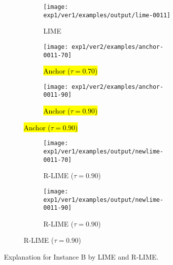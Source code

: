 \begin{figure}[t]
	\begin{subfigure}[t]{0.45\textwidth}
		\begin{subfigure}[t]{\textwidth}
			\hspace{-26.5pt}
			\texttt{[image: exp1/ver1/examples/output/lime-0011]}
			\caption{LIME}\label{fig:lime-1}
			\vspace{1.0em}
		\end{subfigure}

		\vspace{10pt}
		\begin{subfigure}[t]{\textwidth}
			\centering
			\texttt{[image: exp1/ver2/examples/anchor-0011-70]}  %
			\caption{\hl{Anchor ($\tau=0.70$)}}\label{fig:anchor-1-70}
			\vspace{1.0em}
		\end{subfigure}

		\vspace{10pt}
		\begin{subfigure}[t]{\textwidth}
			\centering
			\texttt{[image: exp1/ver2/examples/anchor-0011-90]}  %
			\caption{\hl{Anchor ($\tau=0.90$)}}\label{fig:anchor-1-90}
			\vspace{1.0em}
		\end{subfigure}
	\end{subfigure}
	\hfill
	\begin{subfigure}[t]{0.45\textwidth}
		\begin{subfigure}[t]{\textwidth}
			\hspace{-5pt}
			\texttt{[image: exp1/ver1/examples/output/newlime-0011-70]}  %
			\caption{R-LIME ($\tau=0.90$)}
		\end{subfigure}
		\begin{subfigure}[t]{\textwidth}
			\hspace{-20pt}
			\texttt{[image: exp1/ver1/examples/output/newlime-0011-90]}  %
			\caption{R-LIME ($\tau=0.90$)}\label{fig:rlime-1-90}
		\end{subfigure}
	\end{subfigure}
	\caption[Explanation for Instance B by LIME and R-LIME]{%
		Explanation for Instance B by LIME and R-LIME\@.
	}\label{fig:B}
\end{figure}
